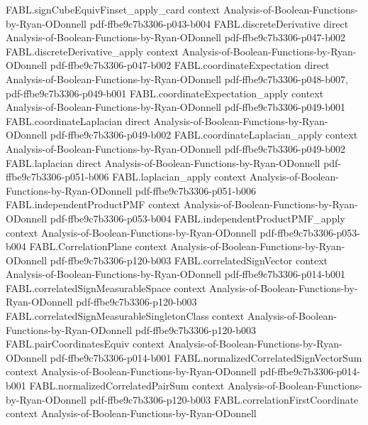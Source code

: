 \begin{theorem}
\proofstep
  {FABL.signCubeEquivFinset_apply_card}
  {context}
  {Analysis-of-Boolean-Functions-by-Ryan-ODonnell}
  {pdf-ffbe9c7b3306-p043-b004}
\proofstep
  {FABL.discreteDerivative}
  {direct}
  {Analysis-of-Boolean-Functions-by-Ryan-ODonnell}
  {pdf-ffbe9c7b3306-p047-b002}
\proofstep
  {FABL.discreteDerivative_apply}
  {context}
  {Analysis-of-Boolean-Functions-by-Ryan-ODonnell}
  {pdf-ffbe9c7b3306-p047-b002}
\proofstep
  {FABL.coordinateExpectation}
  {direct}
  {Analysis-of-Boolean-Functions-by-Ryan-ODonnell}
  {pdf-ffbe9c7b3306-p048-b007,
    pdf-ffbe9c7b3306-p049-b001}
\proofstep
  {FABL.coordinateExpectation_apply}
  {context}
  {Analysis-of-Boolean-Functions-by-Ryan-ODonnell}
  {pdf-ffbe9c7b3306-p049-b001}
\proofstep
  {FABL.coordinateLaplacian}
  {direct}
  {Analysis-of-Boolean-Functions-by-Ryan-ODonnell}
  {pdf-ffbe9c7b3306-p049-b002}
\proofstep
  {FABL.coordinateLaplacian_apply}
  {context}
  {Analysis-of-Boolean-Functions-by-Ryan-ODonnell}
  {pdf-ffbe9c7b3306-p049-b002}
\proofstep
  {FABL.laplacian}
  {direct}
  {Analysis-of-Boolean-Functions-by-Ryan-ODonnell}
  {pdf-ffbe9c7b3306-p051-b006}
\proofstep
  {FABL.laplacian_apply}
  {context}
  {Analysis-of-Boolean-Functions-by-Ryan-ODonnell}
  {pdf-ffbe9c7b3306-p051-b006}
\proofstep
  {FABL.independentProductPMF}
  {context}
  {Analysis-of-Boolean-Functions-by-Ryan-ODonnell}
  {pdf-ffbe9c7b3306-p053-b004}
\proofstep
  {FABL.independentProductPMF_apply}
  {context}
  {Analysis-of-Boolean-Functions-by-Ryan-ODonnell}
  {pdf-ffbe9c7b3306-p053-b004}
\proofstep
  {FABL.CorrelationPlane}
  {context}
  {Analysis-of-Boolean-Functions-by-Ryan-ODonnell}
  {pdf-ffbe9c7b3306-p120-b003}
\proofstep
  {FABL.correlatedSignVector}
  {context}
  {Analysis-of-Boolean-Functions-by-Ryan-ODonnell}
  {pdf-ffbe9c7b3306-p014-b001}
\proofstep
  {FABL.correlatedSignMeasurableSpace}
  {context}
  {Analysis-of-Boolean-Functions-by-Ryan-ODonnell}
  {pdf-ffbe9c7b3306-p120-b003}
\proofstep
  {FABL.correlatedSignMeasurableSingletonClass}
  {context}
  {Analysis-of-Boolean-Functions-by-Ryan-ODonnell}
  {pdf-ffbe9c7b3306-p120-b003}
\proofstep
  {FABL.pairCoordinatesEquiv}
  {context}
  {Analysis-of-Boolean-Functions-by-Ryan-ODonnell}
  {pdf-ffbe9c7b3306-p014-b001}
\proofstep
  {FABL.normalizedCorrelatedSignVectorSum}
  {context}
  {Analysis-of-Boolean-Functions-by-Ryan-ODonnell}
  {pdf-ffbe9c7b3306-p014-b001}
\proofstep
  {FABL.normalizedCorrelatedPairSum}
  {context}
  {Analysis-of-Boolean-Functions-by-Ryan-ODonnell}
  {pdf-ffbe9c7b3306-p120-b003}
\proofstep
  {FABL.correlationFirstCoordinate}
  {context}
  {Analysis-of-Boolean-Functions-by-Ryan-ODonnell}

\end{theorem}
